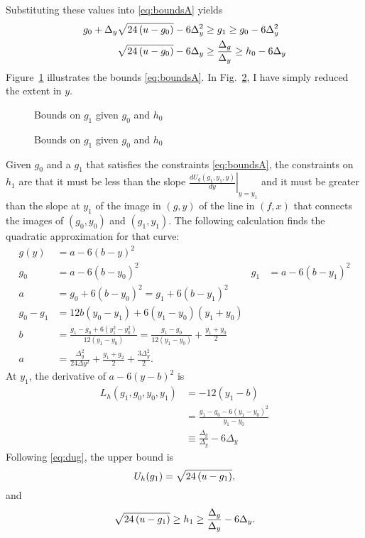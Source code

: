\documentclass[]{article}
\begin{document}
Substituting these values into \eqref{eq:boundsA} yields
\begin{align}
  \label{eq:UL_g}
  g_0 + \Delta_y\sqrt{24\left(u-g_0\right)} - 6 \Delta_y^2 &\geq g_1 \geq g_0 - 6\Delta_y^2 \\
  \label{eq:DG_DY}
  \sqrt{24\left(u-g_0\right)} - 6\Delta_y &\geq \frac{\Delta_g}{\Delta_y} \geq h_0
  - 6 \Delta_y
\end{align}
Figure~\ref{fig:boundsA} illustrates the bounds
\eqref{eq:boundsA}.  In Fig.~\ref{fig:boundsB}, I have simply reduced
the extent in $y$.

\begin{figure}
  \centering
  \caption{Bounds on $g_1$ given $g_0$ and $h_0$}
  \label{fig:boundsA}
\end{figure}
\begin{figure}
  \centering
  \caption{Bounds on $g_1$ given $g_0$ and $h_0$}
  \label{fig:boundsB}
\end{figure}

Given $g_0$ and a $g_1$ that satisfies the constraints
\eqref{eq:boundsA}, the constraints on $h_1$ are that it must be less
than the slope $\left. \frac{d U_g(g_1,y_1,y)}{dy} \right|_{y=y_1}$
and it must be greater than the slope at $y_1$ of the image in $(g,y)$
of the line in $(f,x)$ that connects the images of $(g_0,y_0)$ and
$(g_1,y_1)$.  The following calculation finds the quadratic
approximation for that curve:
\begin{align*}
  g(y) &= a -6(b-y)^2 \\
  g_0 &= a -6(b-y_0)^2 & g_1 &= a -6(b-y_1)^2 \\
  a &= g_0 + 6(b-y_0)^2 =  g_1 + 6(b-y_1)^2 \\
  g_0 -g_1 &= 12b(y_0-y_1) + 6(y_1-y_0)(y_1+y_0) \\
  b &= \frac{g_1-g_0 + 6 (y_1^2-y_0^2)}{12(y_1-y_0)} = \frac{g_1 -
    g_0}{12 (y_1 - y_0)} + \frac{y_1 + y_0}{2}\\
  a &= \frac{\Delta_g^2}{24 \Delta y ^2} + \frac{g_1 + g_2}{2} +
  \frac{ 3 \Delta_y^2}{2}.
\end{align*}
At $y_1$, the derivative of $a-6(y-b)^2$ is
\newcommand{\LhQ}{\frac{\Delta_g}{\Delta_y} - 6 \Delta_y}
\begin{align*}
  L_h(g_1, g_0, y_0, y_1) &= -12(y_1-b) \\
  &= \frac{g_1 - g_0 -6(y_1 - y_0)^2} {y_1-y_0} \\
  & \equiv \LhQ
\end{align*}
Following \eqref{eq:dug}, the upper bound is
\newcommand{\Uh}{\Rad{-g_1}}
\begin{equation*}
  U_h(g_1) = \Uh,
\end{equation*}
and
\begin{equation}
  \label{eq:UL_h}
  \Uh \geq h_1 \geq \LhQ.
\end{equation}
\end{document}
